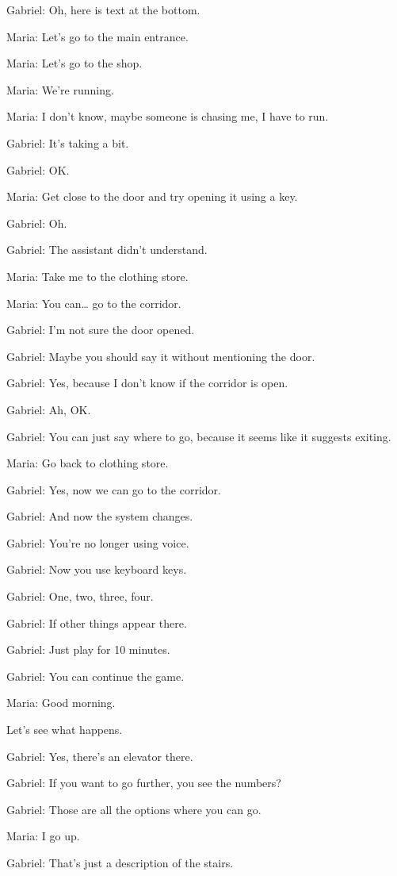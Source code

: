 Gabriel: Oh, here is text at the bottom.

Maria: Let’s go to the main entrance.

Maria: Let’s go to the shop.

Maria: We’re running.

Maria: I don’t know, maybe someone is chasing me, I have to run.

Gabriel: It’s taking a bit.

Gabriel: OK.

Maria: Get close to the door and try opening it using a key.

Gabriel: Oh.

Gabriel: The assistant didn’t understand.

Maria: Take me to the clothing store.

Maria: You can… go to the corridor.

Gabriel: I’m not sure the door opened.

Gabriel: Maybe you should say it without mentioning the door.

Gabriel: Yes, because I don’t know if the corridor is open.

Gabriel: Ah, OK.

Gabriel: You can just say where to go, because it seems like it suggests exiting.

Maria: Go back to clothing store.

Gabriel: Yes, now we can go to the corridor.

Gabriel: And now the system changes.

Gabriel: You’re no longer using voice.

Gabriel: Now you use keyboard keys.

Gabriel: One, two, three, four.

Gabriel: If other things appear there.

Gabriel: Just play for 10 minutes.

Gabriel: You can continue the game.

Maria: Good morning.

Let’s see what happens.

Gabriel: Yes, there’s an elevator there.

Gabriel: If you want to go further, you see the numbers?

Gabriel: Those are all the options where you can go.

Maria: I go up.

Gabriel: That’s just a description of the stairs.


